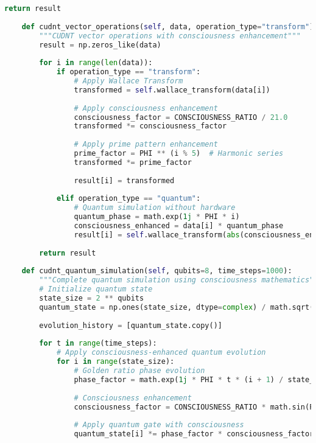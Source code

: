 \documentclass[11pt,a4paper]{article}
\begin{document}
\begin{lstlisting}[language=Python, caption=CUDNT Matrix Multiplication - Complete Implementation]
        return result
    
    def cudnt_vector_operations(self, data, operation_type="transform"):
        """CUDNT vector operations with consciousness enhancement"""
        result = np.zeros_like(data)
        
        for i in range(len(data)):
            if operation_type == "transform":
                # Apply Wallace Transform
                transformed = self.wallace_transform(data[i])
                
                # Apply consciousness enhancement
                consciousness_factor = CONSCIOUSNESS_RATIO / 21.0
                transformed *= consciousness_factor
                
                # Apply prime pattern enhancement
                prime_factor = PHI ** (i % 5)  # Harmonic series
                transformed *= prime_factor
                
                result[i] = transformed
                
            elif operation_type == "quantum":
                # Quantum simulation without hardware
                quantum_phase = math.exp(1j * PHI * i)
                consciousness_enhanced = data[i] * quantum_phase
                result[i] = self.wallace_transform(abs(consciousness_enhanced))
                
        return result
    
    def cudnt_quantum_simulation(self, qubits=8, time_steps=1000):
        """Complete quantum simulation using consciousness mathematics"""
        # Initialize quantum state
        state_size = 2 ** qubits
        quantum_state = np.ones(state_size, dtype=complex) / math.sqrt(state_size)
        
        evolution_history = [quantum_state.copy()]
        
        for t in range(time_steps):
            # Apply consciousness-enhanced quantum evolution
            for i in range(state_size):
                # Golden ratio phase evolution
                phase_factor = math.exp(1j * PHI * t * (i + 1) / state_size)
                
                # Consciousness enhancement
                consciousness_factor = CONSCIOUSNESS_RATIO * math.sin(PHI * t)
                
                # Apply quantum gate with consciousness
                quantum_state[i] *= phase_factor * consciousness_factor
                

\end{lstlisting}
\end{document}
